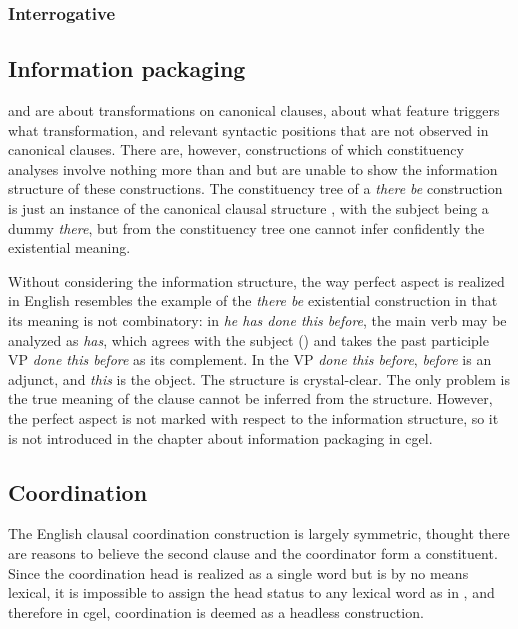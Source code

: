\documentclass{article}
\newcommand*{\corpus}[1]{\emph{#1}}
\begin{document}
\subsubsection{Interrogative}

\subsection{Information packaging}

 and  are about 
transformations on canonical clauses, 
about what feature triggers what transformation,
and relevant syntactic positions that are not observed in canonical clauses.
There are, however, constructions of which constituency analyses involve 
nothing more than  and 
but are unable to show the information structure of these constructions.
The constituency tree of a \corpus{there be} construction is just 
an instance of the canonical clausal structure ,
with the subject being a dummy \corpus{there},
but from the constituency tree one cannot infer confidently the existential meaning.

Without considering the information structure, 
the way perfect aspect is realized in English
resembles the example of the \corpus{there be} existential construction
in that its meaning is not combinatory:
in \corpus{he has done this before},
the main verb may be analyzed as \corpus{has},
which agrees with the subject ()
and takes the past participle VP \corpus{done this before} as its complement.
In the VP \corpus{done this before}, \corpus{before} is an adjunct, 
and \corpus{this} is the object. 
The structure is crystal-clear.
The only problem is the true meaning of the clause cannot be inferred from the structure.
However, the perfect aspect is not marked with respect to the information structure,
so it is not introduced in the chapter about information packaging in \ac{cgel}.

\subsection{Coordination}

The English clausal coordination construction is largely symmetric, 
thought there are reasons to believe the second clause and the coordinator form a constituent.
Since the coordination head is realized as a single word but is by no means lexical,
it is impossible to assign the head status to any lexical word as in ,
and therefore in \ac{cgel}, coordination is deemed as a headless construction. %
\end{document}
